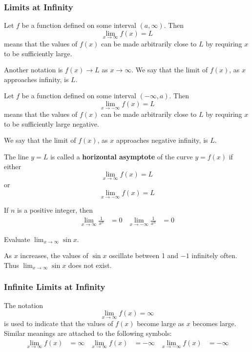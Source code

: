\subsubsection*{Limits at Infinity}
\begin{definition}
    Let \(f\) be a function defined on some interval \((a,\infty)\).
    Then
    \[\lim_{x\to\infty}f(x)=L\]
    means that the values of \(f(x)\) can be made arbitrarily close to \(L\)
    by requiring \(x\) to be sufficiently large.
\end{definition}
Another notation is \(f(x)\to L\) as \(x\to\infty\).
We say that the limit of \(f(x)\),
as \(x\) approaches infinity,
is \(L\).
\begin{definition}
    Let \(f\) be a function defined on some interval \((-\infty,a)\).
    Then
    \[\lim_{x\to-\infty}f(x)=L\]
    means that the values of \(f(x)\) can be made arbitrarily close to \(L\) by requiring
    \(x\) to be sufficiently large negative.
\end{definition}
We say that the limit of \(f(x)\),
as \(x\) approaches negative infinity,
is \(L\).
\begin{definition}
    The line \(y=L\) is called a \textbf{horizontal asymptote} of the curve
    \(y=f(x)\) if either
    \[\lim_{x\to\infty}f(x)=L\]
    or
    \[\lim_{x\to-\infty}f(x)=L\]
\end{definition}
If \(n\) is a positive integer,
then
\begin{align*}
    \lim_{x\to\infty}\frac{1}{x^n} &= 0 & \lim_{x\to-\infty}\frac{1}{x^n} &= 0
\end{align*}
\begin{problem}
    Evaluate \(\displaystyle{\lim_{x\to\infty}\sin x}\).
\end{problem}
\begin{solution}
    As \(x\) increases,
    the values of \(\sin x\) oscillate between 1 and \(-1\) infinitely often.
    Thus \(\displaystyle{\lim_{x\to\infty}\sin x}\) does not exist.
\end{solution}

\subsubsection*{Infinite Limits at Infinity}
The notation
\[\lim_{x\to\infty}f(x)=\infty\]
is used to indicate that the values of \(f(x)\) become large as \(x\) becomes
large.
Similar meanings are attached to the following symbols:
\begin{align*}
    \lim_{x\to\infty}f(x) &= \infty & \lim_{x\to\infty}f(x) &= -\infty
    & \lim_{x\to-\infty}f(x) &= -\infty
\end{align*}

